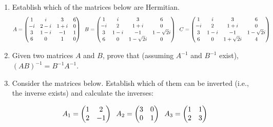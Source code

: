 \documentclass[fleqn]{article}
\begin{document}
\begin{enumerate}
    \item Establish which of the matrices below are Hermitian. $$A = 
      \begin{pmatrix}
        1 & i & 3 & 6 \\
        -i & 2-i & 1+i  & 0 \\
        3 & 1-i & -1 & 1 \\
        6 & 0 & 1 & 0 \\
      \end{pmatrix}\hskip 0.2truecm 
      B=\begin{pmatrix}
        1 & i & 3 & 6 \\
        -i & 2 & 1+i  & 0 \\
        3 & 1-i & -1 & 1-\sqrt{2}i \\
        6 & 0 & 1-\sqrt{2}i & 0 \\
      \end{pmatrix}
      \hskip 0.2truecm 
      C=\begin{pmatrix}
        1 & i & 3 & 6 \\
        -i & 2 & 1+i  & 0 \\
        3 & 1-i & -1 & 1-\sqrt{2}i \\
        6 & 0 & 1+\sqrt{2}i & 4 \\
      \end{pmatrix}
      $$

    \item  Given two matrices $A$ and $B$,  prove that (assuming $A^{-1}$ and $B^{-1}$ exist),
    $(AB)^{-1} = B^{-1}A^{-1} $.  


    \item  Consider the matrices below. Establish which of them can be inverted (i.e., the inverse exists) and calculate the inverses: 

      $$A_1 = 
      \begin{pmatrix}
        1 & 2 \\
        2 & -1
      \end{pmatrix}\hskip 0.2truecm 
      A_2=\begin{pmatrix}
        3 & 0 \\
        0 & 1
      \end{pmatrix}\hskip 0.2truecm
      A_3=\begin{pmatrix}
        1 & 1 \\
        2 & 3
      \end{pmatrix}
      $$


\end{enumerate}
\end{document}
